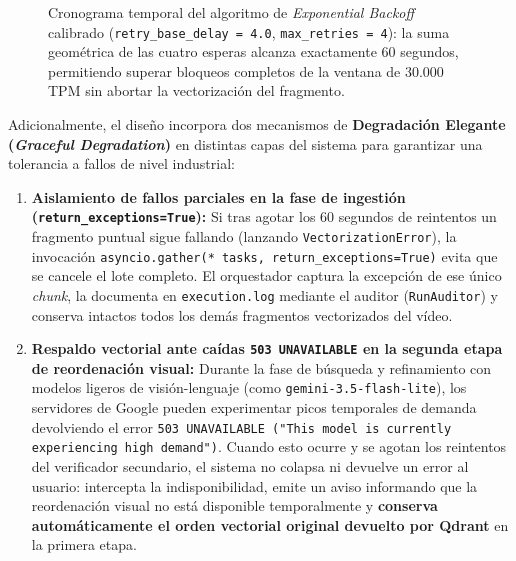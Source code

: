 \begin{figure}[htbp]
\caption{Cronograma temporal del algoritmo de \textit{Exponential Backoff} calibrado (\texttt{retry\_base\_delay = 4.0}, \texttt{max\_retries = 4}): la suma geométrica de las cuatro esperas alcanza exactamente $60$ segundos, permitiendo superar bloqueos completos de la ventana de 30.000 TPM sin abortar la vectorización del fragmento.} %
\label{fig:backoff_ventana_60s}
\end{figure}

Adicionalmente, el diseño incorpora dos mecanismos de \textbf{Degradación Elegante (\textit{Graceful Degradation})} en distintas capas del sistema para garantizar una tolerancia a fallos de nivel industrial: %
\begin{enumerate}
    \item \textbf{Aislamiento de fallos parciales en la fase de ingestión (\texttt{return\_exceptions=True}):} Si tras agotar los $60$ segundos de reintentos un fragmento puntual sigue fallando (lanzando \texttt{VectorizationError}), la invocación \texttt{asyncio.gather(* tasks, return\_exceptions=True)} evita que se cancele el lote completo. %
    El orquestador captura la excepción de ese único \textit{chunk}, la documenta en \texttt{execution.log} mediante el auditor (\texttt{RunAuditor}) y conserva intactos todos los demás fragmentos vectorizados del vídeo. %
    \item \textbf{Respaldo vectorial ante caídas \texttt{503 UNAVAILABLE} en la segunda etapa de reordenación visual:} Durante la fase de búsqueda y refinamiento con modelos ligeros de visión-lenguaje (como \texttt{gemini-3.5-flash-lite}), los servidores de Google pueden experimentar picos temporales de demanda devolviendo el error \texttt{503 UNAVAILABLE ("This model is currently experiencing high demand")}. %
    Cuando esto ocurre y se agotan los reintentos del verificador secundario, el sistema no colapsa ni devuelve un error al usuario: intercepta la indisponibilidad, emite un aviso informando que la reordenación visual no está disponible temporalmente y \textbf{conserva automáticamente el orden vectorial original devuelto por Qdrant} en la primera etapa. %
\end{enumerate}

